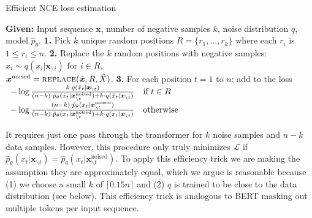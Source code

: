\documentclass[11pt,a4paper]{article}
\newcommand{\replace}[3] {
    \textsc{replace}(#1, #2, #3)
}
\newcommand{\bfx}{\bm{x}^\text{noised}}
\newcommand{\bx}{\bm{x}}
\newcommand{\up}{\hat{p}_\theta}
\newcommand{\hbx}{\hat{\bm{x}}}
\begin{document}
\begin{algorithm}
    \caption{Efficient NCE loss estimation}
    \label{alg:efficient}
    \begin{algorithmic}
    \State \textbf{Given:} Input sequence $\bx$, number of negative samples $k$, noise distribution $q$, model $\up$.  
    \State \textbf{1.} Pick $k$ unique random positions $R = \{r_1, ..., r_k\}$ where each $r_i$ is $1 \leq r_i \leq n$.
    \State \textbf{2.} Replace the $k$ random positions with negative samples: $\hat{x}_i \sim q(x_i | \bx_{\backslash i}) \text{ for } i \in R,$\\ $\bfx = \replace{\hbx}{R}{\hat{X}}$.
    \State \textbf{3.} For each position $t=1 \text{ to } n$: add to the loss
    $
    \begin{array}{l l}
    -\log{\frac{k \cdot q(\hat{x}_t | \bx_{\backslash t})}{(n - k)\cdot \up(\hat{x}_t | \bfx_{\backslash t}) + k\cdot q(\hat{x}_t | \bx_{\backslash t})}} & \text{if } t \in R\\
    -\log{\frac{(n - k)\cdot \up(x_t | \bfx_{\backslash t})}{(n - k)\cdot \up(x_t | \bfx_{\backslash t}) + k\cdot q(x_t | \bx_{\backslash t})}}              & \text{otherwise}
    \end{array}
    $
    \end{algorithmic}
    \vspace{-1mm}
\end{algorithm}
It requires just one pass through the transformer for $k$ noise samples and $n - k$ data samples.
However, this procedure only truly minimizes $\mathcal{L}$ if $\up(x_t | \bx_{\backslash t}) = \up(x_t | \bx^{\text{noised}}_{\backslash t})$. To apply this efficiency trick we are making the assumption they are approximately equal, which we argue is reasonable because (1) we choose a small $k$ of $\lceil0.15n\rceil$ and (2) $q$ is trained to be close to the data distribution (see below). This efficiency trick is analogous to BERT masking out multiple tokens per input sequence. 
\end{document}
